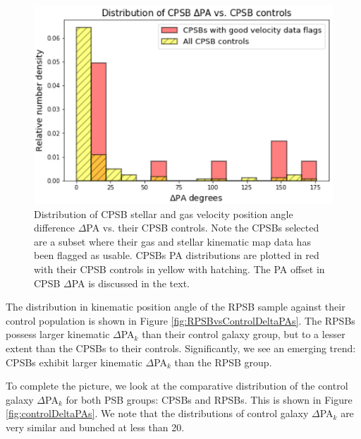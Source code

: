 \begin{figure}
    \centering
    \includegraphics[width=\columnwidth]{images/JupyterPlots/DIST-DPA-CPSB+FLAGS+controls.png}
    \caption[Distribution of CPSB $\Delta$PA vs. their CPSB controls]{Distribution of CPSB stellar and gas velocity position angle difference $\Delta$PA vs. their CPSB controls. Note the CPSBs selected are a subset where their gas and stellar kinematic map data has been flagged as usable. CPSBs PA distributions are plotted in red with their CPSB controls in yellow with hatching. The PA offset in CPSB $\Delta$PA is discussed in the text.}
    \label{fig:CPSBvsControlDeltaPAs}
\end{figure}

The distribution in kinematic position angle of the RPSB sample against their control population is shown in Figure \ref{fig:RPSBvsControlDeltaPAs}. The RPSBs possess larger kinematic $\Delta$PA$_{k}$ than their control galaxy group, but to a lesser extent than the CPSBs to their controls. Significantly, we see an emerging trend: CPSBs exhibit larger kinematic $\Delta$PA$_{k}$ than the RPSB group.

To complete the picture, we look at the comparative distribution of the control galaxy $\Delta$PA$_{k}$ for both PSB groups: CPSBs and RPSBs. This is shown in Figure \ref{fig:controlDeltaPAs}. We note that the distributions of control galaxy $\Delta$PA$_{k}$ are very similar and bunched at less than 20\textdegree. 

